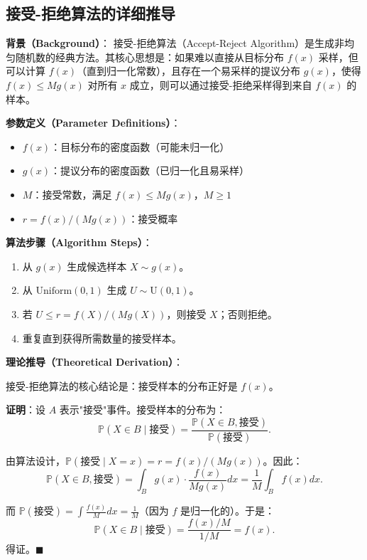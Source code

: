 \subsection{接受-拒绝算法的详细推导}\label{sec:derivation-accept-reject}

\textbf{背景（Background）}：
接受-拒绝算法（Accept-Reject Algorithm）是生成非均匀随机数的经典方法。其核心思想是：如果难以直接从目标分布 $f(x)$ 采样，但可以计算 $f(x)$（直到归一化常数），且存在一个易采样的提议分布 $g(x)$，使得 $f(x) \leqslant M g(x)$ 对所有 $x$ 成立，则可以通过接受-拒绝采样得到来自 $f(x)$ 的样本。

\textbf{参数定义（Parameter Definitions）}：
\begin{itemize}
\item $f(x)$：目标分布的密度函数（可能未归一化）
\item $g(x)$：提议分布的密度函数（已归一化且易采样）
\item $M$：接受常数，满足 $f(x) \leqslant M g(x)$，$M \geqslant 1$
\item $r = f(x) / (M g(x))$：接受概率
\end{itemize}

\textbf{算法步骤（Algorithm Steps）}：
\begin{enumerate}
\item 从 $g(x)$ 生成候选样本 $X \sim g(x)$。
\item 从 $\text{Uniform}(0,1)$ 生成 $U \sim \text{U}(0,1)$。
\item 若 $U \leqslant r = f(X) / (M g(X))$，则接受 $X$；否则拒绝。
\item 重复直到获得所需数量的接受样本。
\end{enumerate}

\textbf{理论推导（Theoretical Derivation）}：

接受-拒绝算法的核心结论是：接受样本的分布正好是 $f(x)$。

\textbf{证明}：设 $A$ 表示"接受"事件。接受样本的分布为：
\[
\mathbb{P}(X \in B \mid \text{接受}) = \frac{\mathbb{P}(X \in B, \text{接受})}{\mathbb{P}(\text{接受})}.
\]

由算法设计，$\mathbb{P}(\text{接受} \mid X = x) = r = f(x) / (M g(x))$。因此：
\[
\mathbb{P}(X \in B, \text{接受}) = \int_B g(x) \cdot \frac{f(x)}{M g(x)} dx = \frac{1}{M} \int_B f(x) dx.
\]

而 $\mathbb{P}(\text{接受}) = \int \frac{f(x)}{M} dx = \frac{1}{M}$（因为 $f$ 是归一化的）。于是：
\[
\mathbb{P}(X \in B \mid \text{接受}) = \frac{f(x)/M}{1/M} = f(x).
\]
得证。$\blacksquare$

